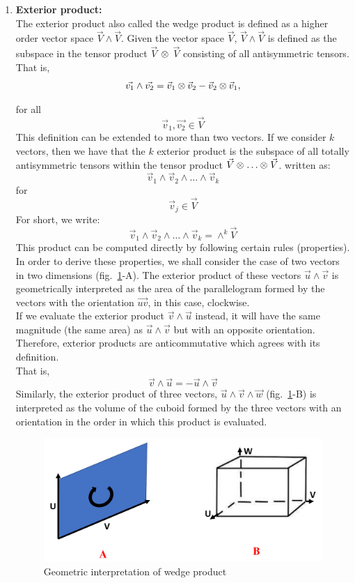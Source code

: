 \documentclass[12pt,onecolumn,letterpaper]{article} %
\newcommand{\tens}[1]{%
  \mathbin{\mathop{\otimes}\displaylimits_{#1}}%
}
\begin{document}
\begin{enumerate}
\item \textbf{Exterior product:}\\
The exterior product also called the wedge product is defined as a higher order vector space $\vec{V} \wedge \vec{V}$. Given the vector space $\vec{V}$, $\vec{V} \wedge \vec{V}$ is defined as the subspace in the tensor product $\vec{V}$ $\tens{}$ $\vec{V}$ consisting of all antisymmetric tensors. That is,
$$\vec{v_1} \wedge \vec{v_2}=\vec{v}_1 \tens{} \vec{v}_2 -\vec{v}_2 \tens{}\vec{v}_1,$$
for all $$\vec{v}_1,\vec{v_2}\in \vec{V}$$
This definition can be extended to more than two vectors. If we consider $k$ vectors, then we have that the $k$ exterior product is the subspace of all totally antisymmetric tensors within the tensor product $\vec{V}\tens{}\dots\tens{}\vec{V} $. written as:
$$\vec{v}_1 \wedge \vec{v}_2 \wedge \dots \wedge \vec{v}_k$$ for $$\vec{v}_j\in \vec{V}$$
For short, we write:
$$\vec{v}_1 \wedge \vec{v}_2 \wedge \dots \wedge \vec{v}_k=\wedge^k\vec{V}$$
This product can be computed directly by following certain rules (properties). In order to derive these properties, we shall consider the case of two vectors in two dimensions (fig.~\ref{doublexx}-A). The exterior product of these vectors $\vec{u}\wedge\vec{v}$ is geometrically interpreted as the area of the parallelogram formed by the vectors with the orientation $\vec{uv}$, in this case, clockwise.\\
If we evaluate the exterior product $\vec{v}\wedge\vec{u}$ instead, it will have the same magnitude (the same area) as $\vec{u}\wedge\vec{v}$ but with an opposite orientation. Therefore, exterior products are anticommutative which agrees with its definition.\\That is,
$$\vec{v}\wedge\vec{u}=-\vec{u}\wedge\vec{v}$$
Similarly, the exterior product of three vectors, $\vec{u}\wedge\vec{v}\wedge\vec{w}$ (fig.~\ref{doublexx}-B) is interpreted as the volume of the cuboid formed by the three vectors with an orientation in the order in which this product is evaluated.\\
\begin{figure}[h]
\centering \includegraphics[width=0.6\linewidth]{WEDGE1}\caption{Geometric interpretation of wedge product} \label{doublexx}

\end{figure}
\end{enumerate}
\end{document}
